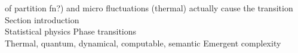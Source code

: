 	of partition fn?) and micro fluctuations (thermal) actually cause the transition 
Section introduction\\
Statistical physics Phase transitions\\
Thermal, quantum, dynamical, computable, semantic Emergent complexity

